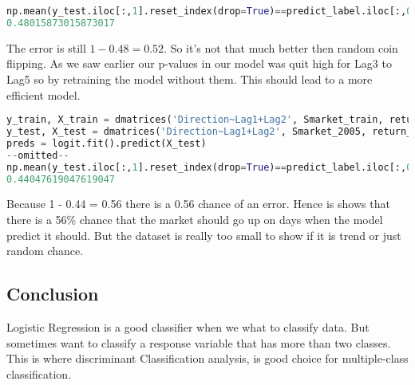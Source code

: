 \begin{lstlisting}[language=Python]
np.mean(y_test.iloc[:,1].reset_index(drop=True)==predict_label.iloc[:,0].reset_index(drop=True))
0.48015873015873017
\end{lstlisting}

The error is still $1 - 0.48 = 0.52$. So it's not that much better then random coin flipping. As we saw earlier our p-values in our model was quit high for Lag3 to Lag5 so by retraining the model without them. This should lead to a more efficient model. 
\begin{lstlisting}[language=Python]
y_train, X_train = dmatrices('Direction~Lag1+Lag2', Smarket_train, return_type = 'dataframe')
y_test, X_test = dmatrices('Direction~Lag1+Lag2', Smarket_2005, return_type = 'dataframe')
preds = logit.fit().predict(X_test)
--omitted--
np.mean(y_test.iloc[:,1].reset_index(drop=True)==predict_label.iloc[:,0].reset_index(drop=True))
0.44047619047619047
\end{lstlisting}
Because 1 - 0.44 = 0.56 there is a 0.56 chance of an error. Hence is shows that there is a 56\% chance that the market should go up on days when the model predict it should. But the dataset is really too small to show if it is trend or just random chance.

\subsection{Conclusion}
Logistic Regression is a good classifier when we what to classify data. But sometimes want to classify a response variable that has more than two classes. This is where discriminant Classification analysis, is good choice for multiple-class classification.
